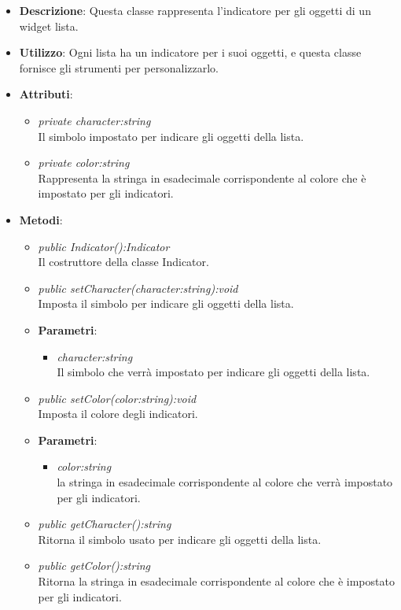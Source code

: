 \begin{itemize}
\item \textbf{Descrizione}: Questa classe rappresenta l'indicatore per gli oggetti di un widget lista.
\item \textbf{Utilizzo}: Ogni lista ha un indicatore per i suoi oggetti, e questa classe fornisce gli strumenti per personalizzarlo.
\item \textbf{Attributi}:
	\begin{itemize}
	\item \textit{private character:string}\\
	Il simbolo impostato per indicare gli oggetti della lista.
	\item \textit{private color:string}\\
	Rappresenta la stringa in esadecimale corrispondente al colore che è impostato per gli indicatori.
	\end{itemize}
\item \textbf{Metodi}:
	\begin{itemize}
	\item \textit{public Indicator():Indicator}\\
	Il costruttore della classe Indicator.
	\item \textit{public setCharacter(character:string):void}\\
	Imposta il simbolo per indicare gli oggetti della lista.
		\item{\textbf{Parametri}: \begin{itemize}
		\item \textit{character:string}\\
		Il simbolo che verrà impostato per indicare gli oggetti della lista.
		\end{itemize}}
	\item \textit{public setColor(color:string):void}\\
	Imposta il colore degli indicatori.
		\item{\textbf{Parametri}: \begin{itemize}
		\item \textit{color:string}\\
		la stringa in esadecimale corrispondente al colore che verrà impostato per gli indicatori.
		\end{itemize}}
	\item \textit{public getCharacter():string}\\
	Ritorna il simbolo usato per indicare gli oggetti della lista.
	\item \textit{public getColor():string}\\
	Ritorna la stringa in esadecimale corrispondente al colore che è impostato per gli indicatori.
	\end{itemize}
\end{itemize}

